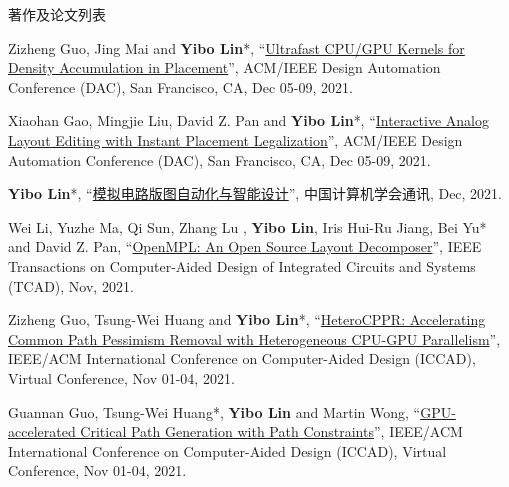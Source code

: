\begin{rSection}{著作及论文列表}
\begin{description}[font=\normalfont, rightmargin=2em]
{}
            

\item[{[C81]}]{
        Zizheng Guo, Jing Mai and \textbf{Yibo Lin}*, 
    ``\href{https://doi.org/10.1109/DAC18074.2021.9586149}{Ultrafast CPU/GPU Kernels for Density Accumulation in Placement}'', 
    ACM/IEEE Design Automation Conference (DAC), San Francisco, CA, Dec 05-09, 2021.
    
}
            

\item[{[C80]}]{
        Xiaohan Gao, Mingjie Liu, David Z. Pan and \textbf{Yibo Lin}*, 
    ``\href{https://doi.org/10.1109/DAC18074.2021.9586234}{Interactive Analog Layout Editing with Instant Placement Legalization}'', 
    ACM/IEEE Design Automation Conference (DAC), San Francisco, CA, Dec 05-09, 2021.
    
}
            

\item[{[J79]}]{
        \textbf{Yibo Lin}*, 
    ``\href{https://dl.ccf.org.cn/article/articleDetail.html?type=xhtx_thesis&_ack=1&id=5743150191429632}{模拟电路版图自动化与智能设计}'', 
    中国计算机学会通讯, Dec, 2021.
    
}
            

\item[{[J78]}]{
        Wei Li, Yuzhe Ma, Qi Sun,  Zhang Lu , \textbf{Yibo Lin}, Iris Hui-Ru Jiang, Bei Yu* and David Z. Pan, 
    ``\href{https://doi.org/10.1109/TCAD.2020.3042175}{OpenMPL: An Open Source Layout Decomposer}'', 
    IEEE Transactions on Computer-Aided Design of Integrated Circuits and Systems (TCAD), Nov, 2021.
    
}
            

\item[{[C77]}]{
        Zizheng Guo, Tsung-Wei Huang and \textbf{Yibo Lin}*, 
    ``\href{https://doi.org/10.1109/ICCAD51958.2021.9643457}{HeteroCPPR: Accelerating Common Path Pessimism Removal with Heterogeneous CPU-GPU Parallelism}'', 
    IEEE/ACM International Conference on Computer-Aided Design (ICCAD), Virtual Conference, Nov 01-04, 2021.
    
}
            

\item[{[C76]}]{
        Guannan Guo, Tsung-Wei Huang*, \textbf{Yibo Lin} and Martin Wong, 
    ``\href{https://doi.org/10.1109/ICCAD51958.2021.9643504}{GPU-accelerated Critical Path Generation with Path Constraints}'', 
    IEEE/ACM International Conference on Computer-Aided Design (ICCAD), Virtual Conference, Nov 01-04, 2021.
    
}
\end{description}
\end{rSection}
